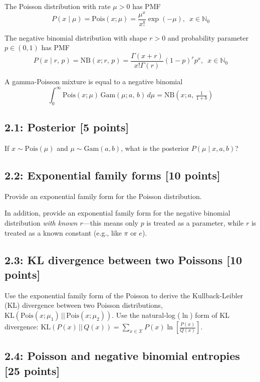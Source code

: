 \documentclass{article}
\begin{document}
The Poisson distribution with rate $\mu>0$ has PMF
\begin{equation}
P(x \mid \mu) = \textrm{Pois}(x; \mu) = \frac{\mu^x}{x!} \exp(-\mu), \,\,\, x \in \mathbb{N}_0
\end{equation}

The negative binomial distribution with shape $r>0$ and probability parameter $p \in (0,1)$ has PMF
\begin{equation}
P(x \mid r,\, p) = \textrm{NB}(x; r,\, p) = \frac{\Gamma(x+r)}{x! \Gamma(r)} (1-p)^r p^x, \,\,\, x \in \mathbb{N}_0
\end{equation}

A gamma-Poisson mixture is equal to a negative binomial
\begin{equation}
\int_{0}^\infty \textrm{Pois}(x; \mu) \,\textrm{Gam}(\mu; a,\,b) \,d\mu = \textrm{NB}(x; a,\, \tfrac{1}{1+b})
\end{equation}

\subsection*{2.1: Posterior [5 points]}
If $x \sim \textrm{Pois}(\mu)$ and $\mu \sim \textrm{Gam}(a, b)$, what is the posterior $P(\mu \mid x, a, b)$?

\subsection*{2.2: Exponential family forms [10 points]} 
Provide an exponential family form for the Poisson distribution.

In addition, provide an exponential family form for the negative binomial distribution \textit{with known $r$}---this means only $p$ is treated as a parameter, while $r$ is treated as a known constant (e.g., like $\pi$ or $e$).

\subsection*{2.3: KL divergence between two Poissons [10 points]} Use the exponential family form of the Poisson to derive the Kullback-Leibler (KL) divergence between two Poisson distributions, $\textrm{KL}(\textrm{Pois}(x; \mu_1) \,||\, \textrm{Pois}(x; \mu_2))$. Use the natural-log ($\ln$) form of KL divergence: 
$\textrm{KL}(P(x) \,||\, Q(x)) = \sum_{x \in \mathcal{X}} P(x) \ln\left[\frac{P(x)}{Q(x)}\right]$.

\subsection*{2.4: Poisson and negative binomial entropies [25 points]}
\end{document}
